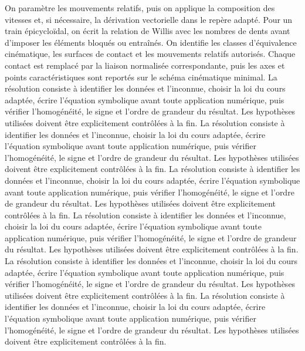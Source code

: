 \begin{corrigebox}[Corrigé]
On paramètre les mouvements relatifs, puis on applique la composition des vitesses et, si nécessaire, la dérivation vectorielle dans le repère adapté. Pour un train épicycloïdal, on écrit la relation de Willis avec les nombres de dents avant d'imposer les éléments bloqués ou entraînés.
On identifie les classes d'équivalence cinématique, les surfaces de contact et les mouvements relatifs autorisés. Chaque contact est remplacé par la liaison normalisée correspondante, puis les axes et points caractéristiques sont reportés sur le schéma cinématique minimal.
La résolution consiste à identifier les données et l'inconnue, choisir la loi du cours adaptée, écrire l'équation symbolique avant toute application numérique, puis vérifier l'homogénéité, le signe et l'ordre de grandeur du résultat. Les hypothèses utilisées doivent être explicitement contrôlées à la fin.
La résolution consiste à identifier les données et l'inconnue, choisir la loi du cours adaptée, écrire l'équation symbolique avant toute application numérique, puis vérifier l'homogénéité, le signe et l'ordre de grandeur du résultat. Les hypothèses utilisées doivent être explicitement contrôlées à la fin.
La résolution consiste à identifier les données et l'inconnue, choisir la loi du cours adaptée, écrire l'équation symbolique avant toute application numérique, puis vérifier l'homogénéité, le signe et l'ordre de grandeur du résultat. Les hypothèses utilisées doivent être explicitement contrôlées à la fin.
La résolution consiste à identifier les données et l'inconnue, choisir la loi du cours adaptée, écrire l'équation symbolique avant toute application numérique, puis vérifier l'homogénéité, le signe et l'ordre de grandeur du résultat. Les hypothèses utilisées doivent être explicitement contrôlées à la fin.
La résolution consiste à identifier les données et l'inconnue, choisir la loi du cours adaptée, écrire l'équation symbolique avant toute application numérique, puis vérifier l'homogénéité, le signe et l'ordre de grandeur du résultat. Les hypothèses utilisées doivent être explicitement contrôlées à la fin.
La résolution consiste à identifier les données et l'inconnue, choisir la loi du cours adaptée, écrire l'équation symbolique avant toute application numérique, puis vérifier l'homogénéité, le signe et l'ordre de grandeur du résultat. Les hypothèses utilisées doivent être explicitement contrôlées à la fin.
\end{corrigebox}
